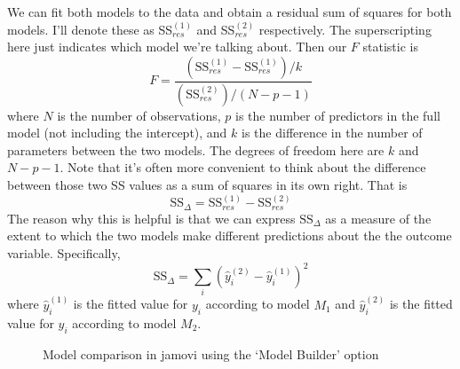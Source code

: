 \vspace{1.5cm}
\begin{mdframed}[style=MyFrame,nobreak=false]
We can fit both models to the data and obtain a residual sum of squares for both models. I'll denote these as SS$_{res}^{(1)}$ and SS$_{res}^{(2)}$ respectively. The superscripting here just indicates which model we're talking about.  Then our $F$ statistic is
$$
F = \frac{(\mbox{SS}_{res}^{(1)} - \mbox{SS}_{res}^{(1)})/k}{(\mbox{SS}_{res}^{(2)})/(N-p-1)}
$$
where $N$ is the number of observations, $p$ is the number of predictors in the full model (not including the intercept), and $k$ is the difference in the number of parameters between the two models. The degrees of freedom here are $k$ and $N-p-1$. Note that it's often more convenient to think about the difference between those two SS values as a sum of squares in its own right. That is 
$$
\mbox{SS}_\Delta = \mbox{SS}_{res}^{(1)} - \mbox{SS}_{res}^{(2)}
$$
The reason why this is helpful is that we can express $\mbox{SS}_\Delta$ as a measure of the extent to which the two models make different predictions about the the outcome variable. Specifically,
$$
\mbox{SS}_\Delta  = \sum_{i} \left( \hat{y}_i^{(2)} - \hat{y}_i^{(1)} \right)^2
$$
where $\hat{y}_i^{(1)}$ is the fitted value for $y_i$ according to model $M_1$ and  $\hat{y}_i^{(2)}$ is the fitted value for $y_i$ according to model $M_2$. 
\end{mdframed}

\vspace{0.3cm}
\begin{figure}[!htb]
\begin{center}
\caption{Model comparison in jamovi using the `Model Builder' option}
\HR
\label{fig:reg8}
\end{center}
\end{figure}

